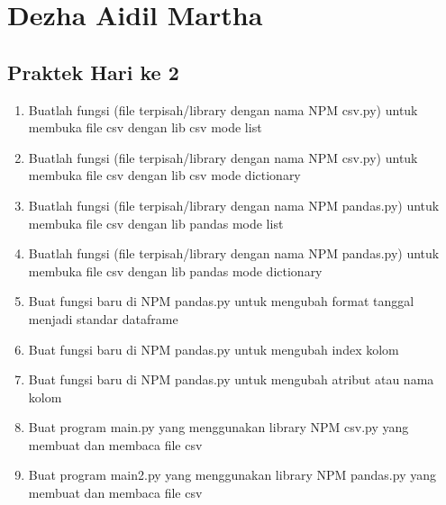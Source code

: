 
\section{Dezha Aidil Martha}
\subsection{Praktek Hari ke 2}
\begin{enumerate}

\item Buatlah fungsi (ﬁle terpisah/library dengan nama NPM csv.py) untuk membuka ﬁle csv dengan lib csv mode list


\item Buatlah fungsi (ﬁle terpisah/library dengan nama NPM csv.py) untuk membuka ﬁle csv dengan lib csv mode dictionary


\item Buatlah fungsi (ﬁle terpisah/library dengan nama NPM pandas.py) untuk membuka ﬁle csv dengan lib pandas mode list


\item Buatlah fungsi (ﬁle terpisah/library dengan nama NPM pandas.py) untuk membuka ﬁle csv dengan lib pandas mode dictionary


\item Buat fungsi baru di NPM pandas.py untuk mengubah format tanggal menjadi standar dataframe


\item Buat fungsi baru di NPM pandas.py untuk mengubah index kolom


\item Buat fungsi baru di NPM pandas.py untuk mengubah atribut atau nama kolom


\item Buat program main.py yang menggunakan library NPM csv.py yang membuat dan membaca ﬁle csv


\item Buat program main2.py yang menggunakan library NPM pandas.py yang membuat dan membaca ﬁle csv


\end{enumerate}